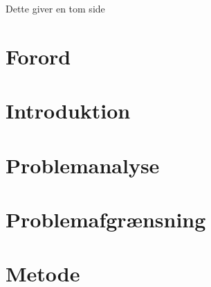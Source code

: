

\raggedbottom





\frontmatter

\clearpage
\thispagestyle{empty}
{\color{white}Dette giver en tom side}
\clearpage



\chapter*{Forord}\vspace{-.75cm}


\newpage


\tableofcontents* 

\mainmatter

\chapter{Introduktion}\vspace{-.75cm} \label{introduktion}


\chapter{Problemanalyse}\vspace{-.75cm} \label{problemanalysen}





\chapter{Problemafgrænsning}\vspace{-.75cm}


\chapter{Metode}\vspace{-.75cm}
\label{metode}

